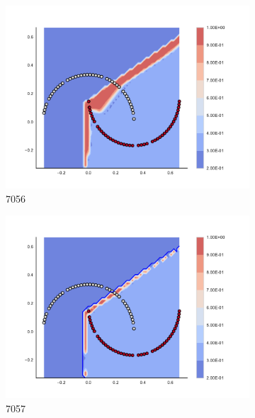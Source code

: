 \begin{figure}[h]
\begin{subfigure}[b]{0.09\textwidth}
    \includegraphics[clip, trim=2.35cm 1.75cm 4.5cm 0cm,width=\textwidth]{img/convergence/7056.pdf}
    \caption{7056}
    \label{fig:convergence_7056}
\end{subfigure}
%
\begin{subfigure}[b]{0.09\textwidth}
    \includegraphics[clip, trim=2.35cm 1.75cm 4.5cm 0cm,width=\textwidth]{img/convergence/7057.pdf}
    \caption{7057}
    \label{fig:convergence_7057}
\end{subfigure}
%
\begin{subfigure}[b]{0.09\textwidth}

\end{subfigure}
\end{figure}
